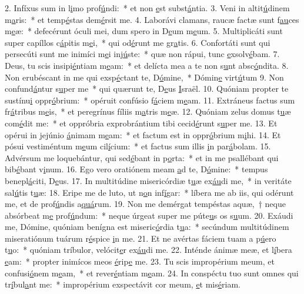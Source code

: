 2. Infíxus sum in l\uline{i}mo prof\uline{ú}ndi:~* et non \uline{e}st subst\uline{á}ntia.
3. Veni in altit\uline{ú}dinem m\uline{a}ris:~* et temp\uline{é}stas dem\uline{é}rsit me.
4. Laborávi clamans, raucæ factæ sunt f\uline{au}ces m\uline{e}æ:~* defecérunt óculi mei, dum spero in D\uline{e}um m\uline{e}um.
5. Multiplicáti sunt super capíllos c\uline{á}pitis m\uline{e}i,~* qui od\uline{é}runt me gr\uline{a}tis.
6. Confortáti sunt qui persecúti sunt me inimíci m\uline{e}i inj\uline{ú}ste:~* quæ non rápui, tunc \uline{e}xsolv\uline{é}bam.
7. Deus, tu scis insipi\uline{é}ntiam m\uline{e}am:~* et delícta mea a te non s\uline{u}nt absc\uline{ó}ndita.
8. Non erubéscant in me qui exsp\uline{é}ctant te, D\uline{ó}mine,~* Dómin\uline{e} virt\uline{ú}tum
9. Non confund\uline{á}ntur s\uline{u}per me~* qui quærunt te, D\uline{e}us \uline{I}sraël.
10. Quóniam propter te sustínu\uline{i} oppr\uline{ó}brium:~* opéruit confúsio f\uline{á}ciem m\uline{e}am.
11. Extráneus factus sum fr\uline{á}tribus m\uline{e}is,~* et peregrínus fíliis m\uline{a}tris m\uline{e}æ.
12. Quóniam zelus domus t\uline{u}æ com\uline{é}dit me:~* et oppróbria exprobrántium tibi cecid\uline{é}runt s\uline{u}per me.
13. Et opérui in jejúnio \uline{á}nimam m\uline{e}am:~* et factum est in oppr\uline{ó}brium m\uline{i}hi.
14. Et pósui vestiméntum m\uline{e}um cil\uline{í}cium:~* et factus sum illis \uline{i}n par\uline{á}bolam.
15. Advérsum me loquebántur, qui sed\uline{é}bant in p\uline{o}rta:~* et in me psallébant qui bib\uline{é}bant v\uline{i}num.
16. Ego vero oratiónem meam \uline{a}d te, D\uline{ó}mine:~* tempus benepl\uline{á}citi, D\uline{e}us.
17. In multitúdine misericórdiæ t\uline{u}æ ex\uline{áu}di me,~* in veritáte sal\uline{ú}tis t\uline{u}æ:
18. Eripe me de luto, ut n\uline{o}n inf\uline{í}gar:~* líbera me ab iis, qui odérunt me, et de prof\uline{ú}ndis a\uline{quá}rum.
19. Non me demérgat tempéstas aquæ,~† neque absórbeat m\uline{e} prof\uline{ú}ndum:~* neque úrgeat super me púte\uline{u}s os s\uline{u}um.
20. Exáudi me, Dómine, quóniam benígna est miseric\uline{ó}rdia t\uline{u}a:~* secúndum multitúdinem miseratiónum tuárum r\uline{é}spice \uline{i}n me.
21. Et ne avértas fáciem tuam a p\uline{ú}ero t\uline{u}o:~* quóniam tríbulor, velócit\uline{e}r ex\uline{áu}di me.
22. Inténde ánimæ meæ, et l\uline{í}bera \uline{e}am:~* propter inimícos meos \uline{é}rip\uline{e} me.
23. Tu scis impropérium meum, et confusi\uline{ó}nem m\uline{e}am,~* et rever\uline{é}ntiam m\uline{e}am.
24. In conspéctu tuo sunt omnes qui tr\uline{í}bul\uline{a}nt me:~* impropérium exspectávit cor meum, \uline{e}t mis\uline{é}riam.
